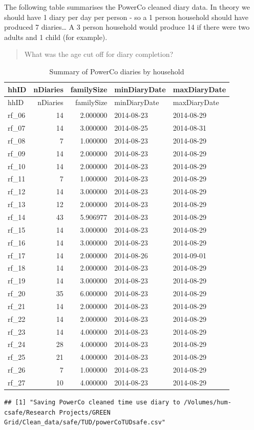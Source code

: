 \documentclass[]{article}
\begin{document}
The following table summarises the PowerCo cleaned diary data. In theory
we should have 1 diary per day per person - so a 1 person household
should have produced 7 diaries\ldots{} A 3 person household would
produce 14 if there were two adults and 1 child (for example).

\begin{quote}
What was the age cut off for diary completion?
\end{quote}

\begin{longtable}[]{@{}lrrll@{}}
\caption{Summary of PowerCo diaries by household}\tabularnewline
\toprule
hhID & nDiaries & familySize & minDiaryDate &
maxDiaryDate\tabularnewline
\midrule
\endfirsthead
\toprule
hhID & nDiaries & familySize & minDiaryDate &
maxDiaryDate\tabularnewline
\midrule
\endhead
rf\_06 & 14 & 2.000000 & 2014-08-23 & 2014-08-29\tabularnewline
rf\_07 & 14 & 3.000000 & 2014-08-25 & 2014-08-31\tabularnewline
rf\_08 & 7 & 1.000000 & 2014-08-23 & 2014-08-29\tabularnewline
rf\_09 & 14 & 2.000000 & 2014-08-23 & 2014-08-29\tabularnewline
rf\_10 & 14 & 2.000000 & 2014-08-23 & 2014-08-29\tabularnewline
rf\_11 & 7 & 1.000000 & 2014-08-23 & 2014-08-29\tabularnewline
rf\_12 & 14 & 3.000000 & 2014-08-23 & 2014-08-29\tabularnewline
rf\_13 & 12 & 2.000000 & 2014-08-23 & 2014-08-29\tabularnewline
rf\_14 & 43 & 5.906977 & 2014-08-23 & 2014-08-29\tabularnewline
rf\_15 & 14 & 3.000000 & 2014-08-23 & 2014-08-29\tabularnewline
rf\_16 & 14 & 3.000000 & 2014-08-23 & 2014-08-29\tabularnewline
rf\_17 & 14 & 2.000000 & 2014-08-26 & 2014-09-01\tabularnewline
rf\_18 & 14 & 2.000000 & 2014-08-23 & 2014-08-29\tabularnewline
rf\_19 & 14 & 3.000000 & 2014-08-23 & 2014-08-29\tabularnewline
rf\_20 & 35 & 6.000000 & 2014-08-23 & 2014-08-29\tabularnewline
rf\_21 & 14 & 2.000000 & 2014-08-23 & 2014-08-29\tabularnewline
rf\_22 & 14 & 2.000000 & 2014-08-23 & 2014-08-29\tabularnewline
rf\_23 & 14 & 4.000000 & 2014-08-23 & 2014-08-29\tabularnewline
rf\_24 & 28 & 4.000000 & 2014-08-23 & 2014-08-29\tabularnewline
rf\_25 & 21 & 4.000000 & 2014-08-23 & 2014-08-29\tabularnewline
rf\_26 & 7 & 1.000000 & 2014-08-23 & 2014-08-29\tabularnewline
rf\_27 & 10 & 4.000000 & 2014-08-23 & 2014-08-29\tabularnewline
\bottomrule
\end{longtable}

\begin{verbatim}
## [1] "Saving PowerCo cleaned time use diary to /Volumes/hum-csafe/Research Projects/GREEN Grid/Clean_data/safe/TUD/powerCoTUDsafe.csv"
\end{verbatim}
\end{document}
